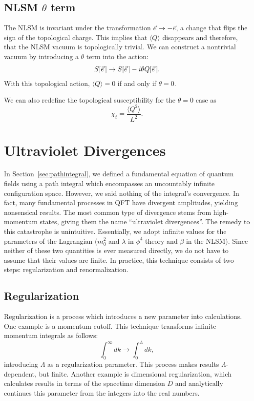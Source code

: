 \subsection{NLSM $\theta$ term}
The NLSM is invariant under the transformation $\vec e \rightarrow -\vec e$, a change that flips the sign of the topological charge. This implies that $\langle Q \rangle$ disappears and therefore, that the NLSM vacuum is topologically trivial.  We can construct a nontrivial vacuum by introducing a $\theta$ term into the action:
\begin{equation}
    S[\vec e\,] \rightarrow S[\vec e\,] - i \theta Q[\vec e\,].
\end{equation}
With this topological action, $\langle Q \rangle = 0$ if and only if $\theta=0$.

We can also redefine the topological susceptibility for the $\theta=0$ case as
\begin{equation}
    \label{eq:chit simple}
    \chi_t = \frac{\langle Q^2 \rangle}{L^2}.
\end{equation}

\section{Ultraviolet Divergences}

In Section~\ref{sec:pathintegral},  we defined a fundamental equation of quantum fields using a path integral which encompasses an uncountably infinite configuration space. However, we said nothing of the integral's convergence. In fact, many fundamental processes in QFT have divergent amplitudes, yielding nonsensical results. The most common type of divergence stems from high-momentum states, giving them the name ``ultraviolet divergences''. The remedy to this catastrophe is unintuitive. Essentially, we adopt infinite values for the parameters of the Lagrangian ($m_0^2$ and $\lambda$ in $\phi^4$ theory and $\beta$ in the NLSM). Since neither of these two quantities is ever measured directly, we do not have to assume that their values are finite. In practice, this technique consists of two steps: regularization and renormalization.


\subsection{Regularization}

Regularization is a process which introduces a new parameter into calculations. One example is a momentum cutoff. This technique transforms infinite momentum integrals as follows:  
\begin{equation*}
    \int_0^\infty dk \rightarrow \int_0^\Lambda dk,
\end{equation*}
introducing $\Lambda$ as a regularization parameter. This process makes results $\Lambda$-dependent, but finite. Another example is dimensional regularization, which calculates results in terms of the spacetime dimension $D$ and analytically continues this parameter from the integers into the real numbers. 

